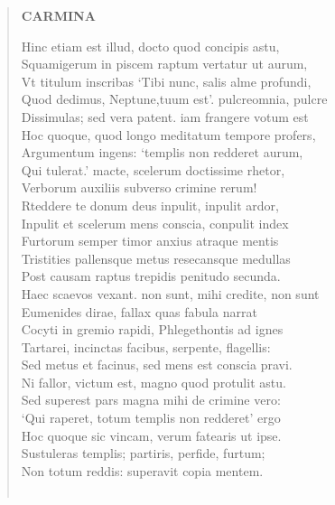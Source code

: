 \documentclass[11pt, a4paper]{report}
\begin{document}
\begin{verse}
    \begin{center} \textbf{CARMINA} \end{center} \marginpar{[94]} Hinc etiam est illud, docto quod concipis astu, \\ Squamigerum in piscem raptum vertatur ut aurum, \\ Vt titulum inscribas ‘Tibi nunc, salis alme profundi, \\ Quod dedimus, Neptune,tuum est’. pulcreomnia, pulcre \\ Dissimulas; sed vera patent. iam frangere votum est \\ Hoc quoque, quod longo meditatum tempore profers, \\ Argumentum ingens: ‘templis non redderet aurum, \\ Qui tulerat.’ macte, scelerum doctissime rhetor, \\ Verborum auxiliis subverso crimine rerum! \\ Rteddere te donum deus inpulit, inpulit ardor, \\ Inpulit et scelerum mens conscia, conpulit index \\ Furtorum semper timor anxius atraque mentis \\ Tristities pallensque metus resecansque medullas \\ Post causam raptus trepidis penitudo secunda. \\ Haec scaevos vexant. non sunt, mihi credite, non sunt \\ Eumenides dirae, fallax quas fabula narrat \\ Cocyti in gremio rapidi, Phlegethontis ad ignes \\ Tartarei, incinctas facibus, serpente, flagellis: \\ Sed metus et facinus, sed mens est conscia pravi. \\ Ni fallor, victum est, magno quod protulit astu. \\ Sed superest pars magna mihi de crimine vero: \\ ‘Qui raperet, totum templis non redderet’ ergo \\ Hoc quoque sic vincam, verum fatearis ut ipse. \\ Sustuleras templis; partiris, perfide, furtum; \\ Non totum reddis: superavit copia mentem. \\ 
        ﻿\pagebreak 

\end{verse}
\end{document}

